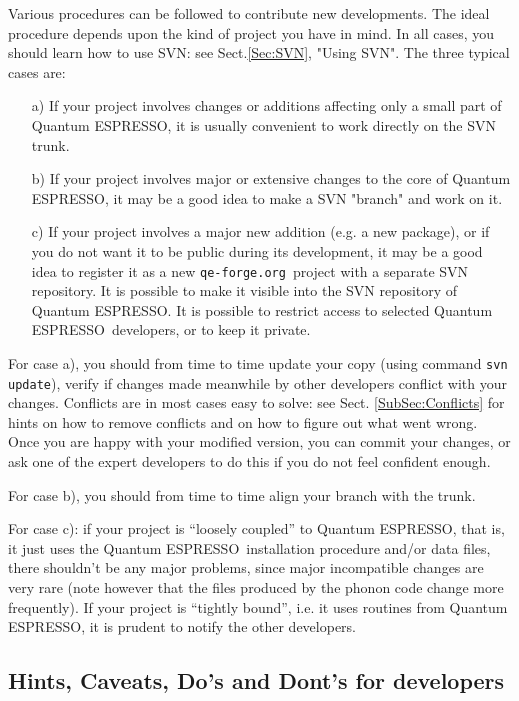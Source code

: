 \documentclass[12pt,a4paper]{article}
\def\qe{{\sc Quantum ESPRESSO}}
\def\qeforge{\texttt{qe-forge.org}}
\begin{document}
Various procedures can be followed to contribute new developments.
The ideal procedure depends upon the kind of project you have in
mind. In all cases, you should learn how to use SVN: see Sect.\ref{Sec:SVN}, 
"Using SVN". The three typical cases are:
\begin{itemize}
\item[a)] If your project involves changes or additions affecting only 
a small part of \qe, it is usually convenient to work directly on 
the SVN trunk.
\item[b)] 
If your project involves major or extensive changes to the core of
\qe, it may be a good idea to make a SVN "branch" and work on it.
\item[c)]
If your project involves a major new addition (e.g. a new package),
or if you do not want it to be public during its development,
it may be a good idea to register it as a new \qeforge\ project
with a separate SVN repository. It is possible to make it visible
into the SVN repository of \qe. It is possible to restrict access
to selected \qe\ developers, or to keep it private.
\end{itemize}

For case a), you should from time to time update your copy (using command
\texttt{svn update}), verify if changes made meanwhile by other developers
conflict with your changes. Conflicts are in most cases easy to solve:
see Sect. \ref{SubSec:Conflicts} for hints on how to 
remove conflicts and on how to figure out what went wrong.
Once you are happy with your modified version, you can commit your
changes, or ask one of the expert developers to do this if you do not
feel confident enough.

For case b), you should from time to time align your branch with the
trunk.

For case c): if your project is ``loosely coupled'' to \qe, that is,
it just uses the \qe\ installation procedure and/or data files, there
shouldn't be any major problems, since major incompatible changes are
very rare (note however that the files produced by the phonon code
change more frequently). If your project is ``tightly bound'', i.e. 
it uses routines from \qe, it is prudent to notify the other
developers.

\subsection{Hints, Caveats, Do's and Dont's for developers}
\end{document}
